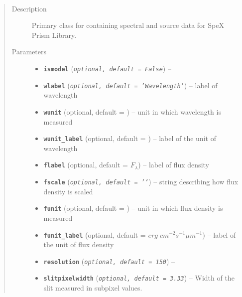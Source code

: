 \documentclass[letterpaper,10pt,english]{sphinxmanual}
\begin{document}
\begin{fulllineitems}
\label{api:splat.Spectrum}~\begin{quote}\begin{description}
\item[{Description}] \leavevmode
Primary class for containing spectral and source data for SpeX Prism Library.

\item[{Parameters}] \leavevmode\begin{itemize}
\item {} 
\textbf{\texttt{ismodel}} (\emph{\texttt{optional, default = False}}) -- 

\item {} 
\textbf{\texttt{wlabel}} (\emph{\texttt{optional, default = 'Wavelength'}}) -- label of wavelength

\item {} 
\textbf{\texttt{wunit}} (optional, default = ) -- unit in which wavelength is measured

\item {} 
\textbf{\texttt{wunit\_label}} (optional, default = ) -- label of the unit of wavelength

\item {} 
\textbf{\texttt{flabel}} (optional, default = \(F_{\lambda}\)) -- label of flux density

\item {} 
\textbf{\texttt{fscale}} (\emph{\texttt{optional, default = '{'}}}) -- string describing how flux density is scaled

\item {} 
\textbf{\texttt{funit}} (optional, default = ) -- unit in which flux density is measured

\item {} 
\textbf{\texttt{funit\_label}} (optional, default = \(erg\;cm^{-2} s^{-1} \mu m^{-1}\)) -- label of the unit of flux density

\item {} 
\textbf{\texttt{resolution}} (\emph{\texttt{optional, default = 150}}) -- 

\item {} 
\textbf{\texttt{slitpixelwidth}} (\emph{\texttt{optional, default = 3.33}}) -- Width of the slit measured in subpixel values.


\end{itemize}
\end{description}
\end{quote}
\end{fulllineitems}
\end{document}
